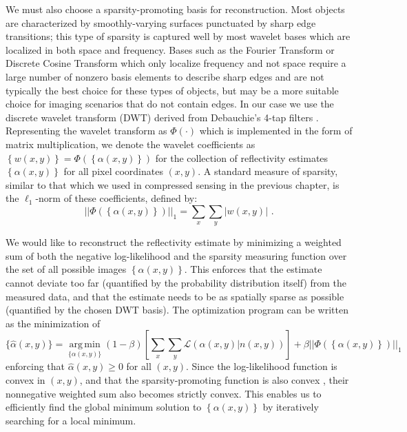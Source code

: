 We must also choose a sparsity-promoting basis for reconstruction. Most objects are characterized by smoothly-varying surfaces punctuated by sharp edge transitions; this type of sparsity is captured well by most wavelet bases which are localized in both space and frequency. Bases such as the Fourier Transform or Discrete Cosine Transform which only localize frequency and not space require a large number of nonzero basis elements to describe sharp edges and are not typically the best choice for these types of objects, but may be a more suitable choice for imaging scenarios that do not contain edges. In our case we use the discrete wavelet transform (DWT) derived from Debauchie's 4-tap filters \cite{mallat-wavelet}. Representing the wavelet transform as $\Phi\left(\cdot\right)$ which is implemented in the form of matrix multiplication, we denote the wavelet coefficients as $\left\{ w(x,y) \right\} = \Phi(\left\{ \alpha(x,y) \right\})$ for the collection of reflectivity estimates $\left\{ \alpha(x,y) \right\}$ for all pixel coordinates $(x,y)$. A standard measure of sparsity, similar to that which we used in compressed sensing in the previous chapter, is the $\ell_1$-norm of these coefficients, defined by:
\begin{equation}
|| \Phi\left(\left\{ \alpha(x,y) \right\}\right) ||_1 = \sum_x \sum_y | w(x,y) |\,\,.
\end{equation}

We would like to reconstruct the reflectivity estimate by minimizing a weighted sum of both the negative log-likelihood and the sparsity measuring function over the set of all possible images $\left\{\alpha(x,y)\right\}$. This enforces that the estimate cannot deviate too far (quantified by the probability distribution itself) from the measured data, and that the estimate needs to be as spatially sparse as possible (quantified by the chosen DWT basis). The optimization program can be written as the minimization of
\begin{equation}
\{ \hat{\alpha}(x,y) \} = \underset{\{\alpha(x,y)\}}{\operatorname{arg\,min}} (1 - \beta) \left[ \sum_x \sum_y \mathcal{L}( \alpha(x,y) | n(x,y) ) \right] + \beta || \Phi\left(\left\{ \alpha(x,y) \right\}\right) ||_1
\end{equation}
enforcing that $\hat{\alpha}(x,y) \geq 0$ for all $(x,y)$. Since the log-likelihood function is convex in $(x,y)$, and that the sparsity-promoting function is also convex \cite{boyd-convex}, their nonnegative weighted sum also becomes strictly convex. This enables us to efficiently find the global minimum solution to $\left\{ \alpha(x,y) \right\}$ by iteratively searching for a local minimum.

